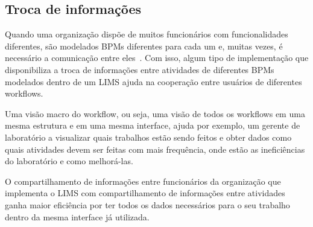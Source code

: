 \subsection{Troca de informações}


Quando uma organização dispõe de muitos funcionários com funcionalidades diferentes, são modelados BPMs diferentes para cada um e, muitas vezes, é necessário a comunicação entre eles~\cite{Holbein1996AOrganisations}. Com isso, algum tipo de implementação que disponibiliza a troca de informações entre atividades de diferentes BPMs modelados dentro de um LIMS ajuda na cooperação entre usuários de diferentes workflows.






Uma visão macro do workflow, ou seja, uma visão de todos os workflows em uma mesma estrutura e em uma mesma interface, ajuda por exemplo, um gerente de laboratório a visualizar quais trabalhos estão sendo feitos e obter dados como quais atividades devem ser feitas com mais frequência, onde estão as ineficiências do laboratório e como melhorá-las.

O compartilhamento de informações entre funcionários da organização que implementa o LIMS com compartilhamento de informações entre atividades ganha maior eficiência por ter todos os dados necessários para o seu trabalho dentro da mesma interface já utilizada.

